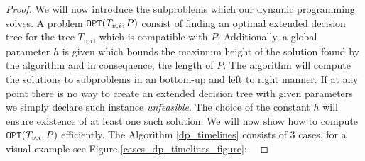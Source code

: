 \begin{theorem}
\begin{proof}
We will now introduce the subproblems which our dynamic programming solves. A problem $\texttt{OPT}\mathopen{}\left( T_{v,i}, P \right)$ consist of finding an optimal extended decision tree for the tree $T_{v,i}$, which is compatible with $P$. Additionally, a global parameter $h$ is given which bounds the maximum height of the solution found by the algorithm and in consequence, the length of $P$. The algorithm will compute the solutions to subproblems in an bottom-up and left to right manner. If at any point there is no way to create an extended decision tree with given parameters we simply declare such instance \textit{unfeasible}. The choice of the constant $h$ will ensure existence of at least one such solution. We will now show how to compute $\texttt{OPT}\mathopen{}\left( T_{v,i}, P \right)$ efficiently. The Algorithm \ref{dp_timelines} consists of 3 cases, for a visual example see Figure \ref{cases_dp_timelines_figure}:
\




\end{proof}
\end{theorem}
